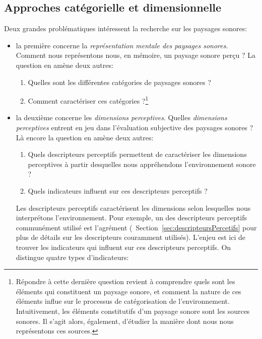 \subsection{Approches catégorielle et dimensionnelle}
\label{sec:ch3_appCatDim}

Deux grandes problématiques intéressent la recherche sur les paysages sonores:

\begin{itemize}
\item la première concerne la \emph{représentation mentale des paysages sonores}. Comment nous représentons nous, en mémoire, un paysage sonore perçu ? La question en amène deux autres:

\begin{enumerate}
\item Quelles sont les différentes catégories de paysages sonores ?
\item Comment caractériser ces catégories ?\footnote{Répondre à cette dernière question revient à comprendre quels sont les éléments qui constituent un paysage sonore, et comment la nature de ces éléments influe sur le processus de catégorisation de l'environnement. Intuitivement, les éléments constitutifs d'un paysage sonore sont les sources sonores. Il s'agit alors, également, d'étudier la manière dont nous nous représentons ces sources.}
\end{enumerate}

\item la deuxième concerne les \emph{dimensions perceptives}. Quelles \emph{dimensions perceptives} entrent en jeu dans l'évaluation subjective des paysages sonores ? Là encore la question en amène deux autres:
\begin{enumerate}
\item Quels descripteurs perceptifs permettent de caractériser les dimensions perceptives à partir desquelles nous appréhendons l'environnement sonore ?
\item Quels indicateurs influent sur ces descripteurs perceptifs ?
\end{enumerate}

Les descripteurs perceptifs caractérisent les dimensions selon lesquelles nous interprétons l'environnement. Pour exemple, un des descripteurs perceptifs communément utilisé est l'agrément (\cf~Section~\ref{sec:descripteursPercetifs} pour plus de détails sur les descripteurs couramment utilisés). L'enjeu est ici de trouver les indicateurs qui influent sur ces descripteurs perceptifs. On distingue quatre types d'indicateurs:


\end{itemize}
